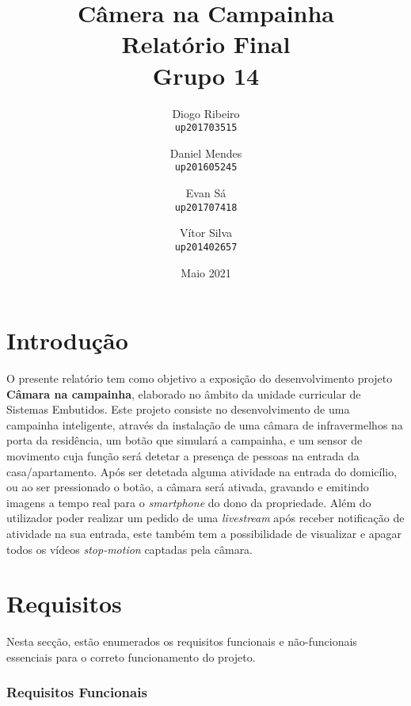 \documentclass{article}
\title{Câmera na Campainha \\ Relatório Final \\ Grupo 14}
\author{Diogo Ribeiro \\\texttt{up201703515} \and Daniel Mendes\\\texttt{up201605245} \and Evan Sá\\\texttt{up201707418} \and Vítor Silva\\\texttt{up201402657}}
\date{Maio 2021}
\begin{document}
\maketitle

\section{Introdução}
\vspace{2mm}
\hspace{0.5cm} O presente relatório tem como objetivo a exposição do desenvolvimento projeto \textbf{Câmara na campainha}, elaborado no âmbito da unidade curricular de Sistemas Embutidos. Este projeto consiste no desenvolvimento de uma campainha inteligente, através da instalação de uma câmara de infravermelhos na porta da residência, um botão que simulará a campainha, e um sensor de movimento cuja função será detetar a presença de pessoas na entrada da casa/apartamento. Após ser detetada alguma atividade na entrada do domicílio, ou ao ser pressionado o botão, a câmara será ativada, gravando e emitindo imagens a tempo real para o \textit{smartphone} do dono da propriedade. Além do utilizador poder realizar um pedido de uma \textit{livestream} após receber notificação de atividade na sua entrada, este também tem a possibilidade de visualizar e apagar todos os vídeos \textit{stop-motion} captadas pela câmara.

\section{Requisitos}
\vspace{2mm}
\hspace{0.5cm} Nesta secção, estão enumerados os requisitos funcionais e não-funcionais essenciais para o correto funcionamento do projeto.

\subsubsection{Requisitos Funcionais}
\vspace{2mm}
\end{document}
